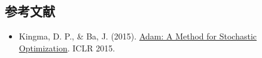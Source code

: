 \FloatBarrier
{}
\hypertarget{ux53c2ux8003ux6587ux732e-28}{%
\subsection{参考文献}\label{ux53c2ux8003ux6587ux732e-28}}

\vspace{0.25em}
\begin{itemize}
\tightlist
\item
  Kingma, D. P., \& Ba, J. (2015). \href{https://arxiv.org/abs/1412.6980}{Adam: A Method for Stochastic Optimization}. ICLR 2015.
\end{itemize}

\clearpage
